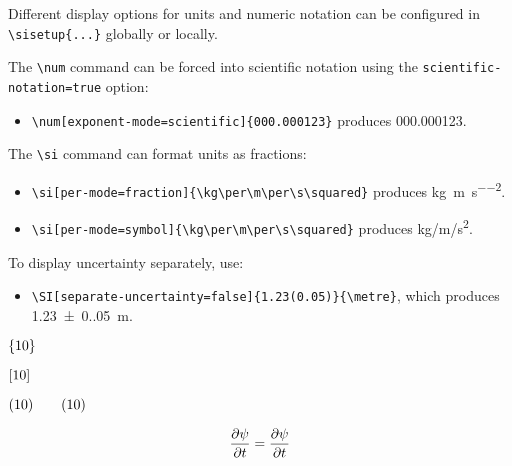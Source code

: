 Different display options for units and numeric notation can be configured in \verb|\sisetup{...}| globally or locally.

The \verb|\num| command can be forced into scientific notation using the \verb|scientific-notation=true| option:
\begin{itemize}
    \item \verb|\num[exponent-mode=scientific]{000.000123}| produces \num[exponent-mode=scientific]{000.000123}.
\end{itemize}

The \verb|\si| command can format units as fractions:
\begin{itemize}
    \item \verb|\si[per-mode=fraction]{\kg\per\m\per\s\squared}| produces \si[per-mode=fraction]{\kg\per\m\per\s\squared}.
    \item \verb|\si[per-mode=symbol]{\kg\per\m\per\s\squared}| produces \si[per-mode=symbol]{\kg\per\m\per\s\squared}.
\end{itemize}

To display uncertainty separately, use:
\begin{itemize}
    \item \verb|\SI[separate-uncertainty=false]{1.23(0.05)}{\metre}|, which produces \SI[separate-uncertainty=false]{1.23(0.05)}{\metre}.
\end{itemize}







$\set{10}$

$\set[10]$

$\set(10) \qquad \qty(10)$


\begin{equation}
	\pdv{\psi}{t}
	=
	\frac{\partial \psi}{\partial t}
\end{equation}

